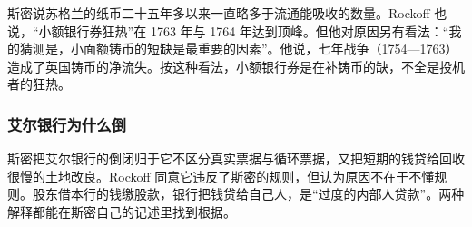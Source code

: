 斯密说苏格兰的纸币二十五年多以来一直略多于流通能吸收的数量。Rockoff 也说，“小额银行券狂热”在 1763 年与 1764 年达到顶峰\cite{rockoff2009}。但他对原因另有看法：“我的猜测是，小面额铸币的短缺是最重要的因素”。他说，七年战争（1754—1763）造成了英国铸币的净流失\cite{rockoff2009}。按这种看法，小额银行券是在补铸币的缺，不全是投机者的狂热。

\subsubsection{艾尔银行为什么倒}
斯密把艾尔银行的倒闭归于它不区分真实票据与循环票据，又把短期的钱贷给回收很慢的土地改良。Rockoff 同意它违反了斯密的规则，但认为原因不在于不懂规则。股东借本行的钱缴股款，银行把钱贷给自己人，是“过度的内部人贷款”\cite{rockoff2009}。两种解释都能在斯密自己的记述里找到根据。

